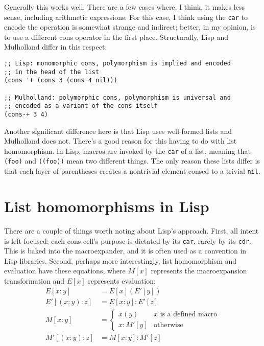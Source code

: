 \documentclass{report}
\begin{document}
  Generally this works well. There are a few cases where, I think, it makes less sense, including arithmetic expressions. For this case, I think using the {\tt car} to encode the operation is
  somewhat strange and indirect; better, in my opinion, is to use a different cons operator in the first place. Structurally, Lisp and Mulholland differ in this respect:

\begin{verbatim}
;; Lisp: monomorphic cons, polymorphism is implied and encoded
;; in the head of the list
(cons '+ (cons 3 (cons 4 nil)))

;; Mulholland: polymorphic cons, polymorphism is universal and
;; encoded as a variant of the cons itself
(cons-+ 3 4)
\end{verbatim}

  Another significant difference here is that Lisp uses well-formed lists and Mulholland does not. There's a good reason for this having to do with list homomorphism. In Lisp, macros are
  invoked by the {\tt car} of a list, meaning that {\tt (foo)} and {\tt ((foo))} mean two different things. The only reason these lists differ is that each layer of parentheses creates a
  nontrivial element consed to a trivial {\tt nil}.

\section{List homomorphisms in Lisp}
    There are a couple of things worth noting about Lisp's approach. First, all intent is left-focused; each cons cell's purpose is dictated by its {\tt car}, rarely by its {\tt cdr}. This is
    baked into the macroexpander, and it is often used as a convention in Lisp libraries. Second, perhaps more interestingly, list homomorphism and evaluation have these equations, where
    $M[x]$ represents the macroexpansion transformation and $E[x]$ represents evaluation:
\begin{align*}
E[x:y]      & = E[x](E'[y]) \\
E'[(x:y):z] & = E[x:y]:E'[z] \\
M[x:y]      & = \begin{cases}
                  x(y)    & \textrm{$x$ is a defined macro} \\
                  x:M'[y] & \textrm{otherwise}
                \end{cases} \\
M'[(x:y):z] & = M[x:y]:M'[z]
\end{align*}
\end{document}
